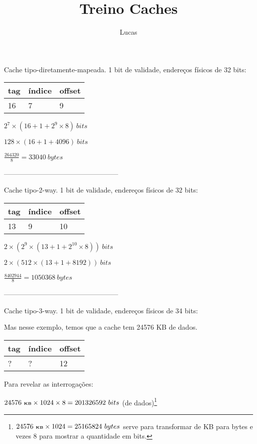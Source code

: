 \documentclass[11pt,twocolumn]{article}
\author{Lucas}
\title{Treino Caches}
\begin{document}
\maketitle

Cache tipo-diretamente-mapeada. 1 bit de validade, endereços físicos de 32 bits:

\begin{tabular}{|l|l|l|}
\hline tag & índice & offset \\ 
\hline 16 & 7 & 9 \\ 
\hline 
\end{tabular}


$2^{7} \times (16 + 1 + 2^{9} \times 8)\ bits$

$128 \times (16+1+4096)\ bits$

$\frac{264320}{8}=33040\ bytes$

--------------------------------------------------

Cache tipo-2-way. 1 bit de validade, endereços físicos de 32 bits:

\begin{tabular}{|l|l|l|}
\hline tag & índice & offset \\ 
\hline 13 & 9 & 10 \\ 
\hline 
\end{tabular}


$2\times(2^{9}\times(13+1+2^{10}\times8))\ bits$

$2\times(512\times(13+1+8192))\ bits$

$\frac{8402944}{8}=1050368\ bytes$

--------------------------------------------------

Cache tipo-3-way. 1 bit de validade, endereços físicos de 34 bits:

Mas nesse exemplo, temos que a cache tem 24576 KB de dados.

\begin{tabular}{|l|l|l|}
\hline tag & índice & offset \\ 
\hline ? & ? & 12 \\ 
\hline 
\end{tabular}


Para revelar as interrogações:

$24576\ \textbf{\tiny KB} \times 1024 \times 8 = 201326592\ bits$ (de 
dados)\footnote{$24576\ \textbf{\tiny KB} \times 1024 = 25165824\ bytes$ serve 
para transformar de KB para bytes e vezes 8 para mostrar a quantidade em 
bits.}
\end{document}
